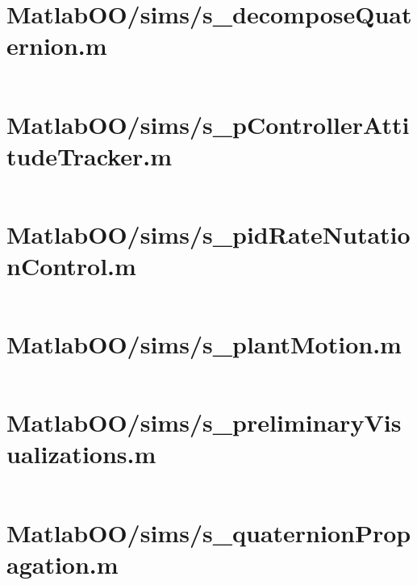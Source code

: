 \pagebreak
\section*{MatlabOO/sims/s\_decomposeQuaternion.m}\label{code:MatlabOO/sims/s_decomposeQuaternion.m}
\inputminted[linenos,fontsize=\scriptsize]{matlab}{/home/dcouture/git/mathyourlife/TSatPy/beta_versions/matlab_object_oriented/sims/s_decomposeQuaternion.m}

\pagebreak
\section*{MatlabOO/sims/s\_pControllerAttitudeTracker.m}\label{code:MatlabOO/sims/s_pControllerAttitudeTracker.m}
\inputminted[linenos,fontsize=\scriptsize]{matlab}{/home/dcouture/git/mathyourlife/TSatPy/beta_versions/matlab_object_oriented/sims/s_pControllerAttitudeTracker.m}

\pagebreak
\section*{MatlabOO/sims/s\_pidRateNutationControl.m}\label{code:MatlabOO/sims/s_pidRateNutationControl.m}
\inputminted[linenos,fontsize=\scriptsize]{matlab}{/home/dcouture/git/mathyourlife/TSatPy/beta_versions/matlab_object_oriented/sims/s_pidRateNutationControl.m}

\pagebreak
\section*{MatlabOO/sims/s\_plantMotion.m}\label{code:MatlabOO/sims/s_plantMotion.m}
\inputminted[linenos,fontsize=\scriptsize]{matlab}{/home/dcouture/git/mathyourlife/TSatPy/beta_versions/matlab_object_oriented/sims/s_plantMotion.m}

\pagebreak
\section*{MatlabOO/sims/s\_preliminaryVisualizations.m}\label{code:MatlabOO/sims/s_preliminaryVisualizations.m}
\inputminted[linenos,fontsize=\scriptsize]{matlab}{/home/dcouture/git/mathyourlife/TSatPy/beta_versions/matlab_object_oriented/sims/s_preliminaryVisualizations.m}

\pagebreak
\section*{MatlabOO/sims/s\_quaternionPropagation.m}\label{code:MatlabOO/sims/s_quaternionPropagation.m}
\inputminted[linenos,fontsize=\scriptsize]{matlab}{/home/dcouture/git/mathyourlife/TSatPy/beta_versions/matlab_object_oriented/sims/s_quaternionPropagation.m}

